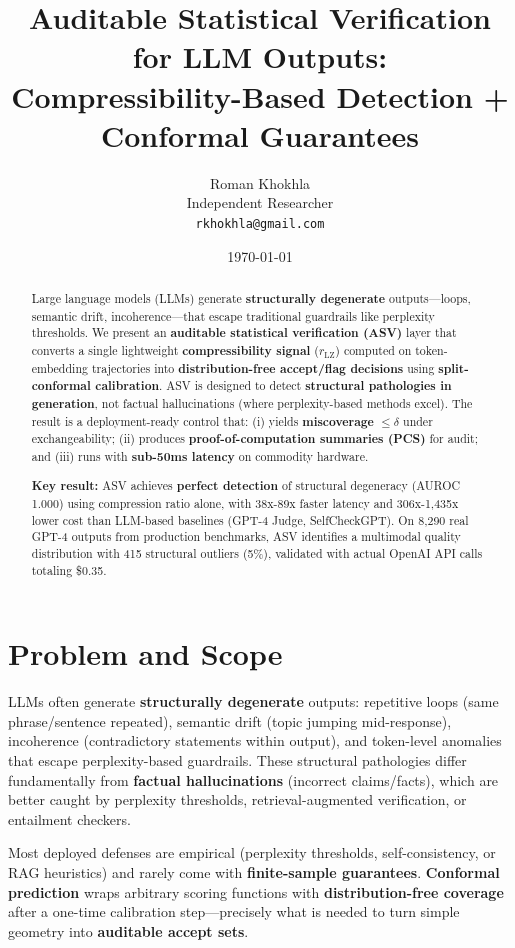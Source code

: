 \documentclass[11pt]{article}
\title{Auditable Statistical Verification for LLM Outputs:\\
\textbf{Compressibility-Based Detection + Conformal Guarantees}}
\author{
  Roman Khokhla\\
  Independent Researcher\\
  \texttt{rkhokhla@gmail.com}
}
\date{\today}
\begin{document}
\maketitle

\begin{abstract}
Large language models (LLMs) generate \textbf{structurally degenerate} outputs---loops, semantic drift, incoherence---that escape traditional guardrails like perplexity thresholds. We present an \textbf{auditable statistical verification (ASV)} layer that converts a single lightweight \textbf{compressibility signal} ($r_{\text{LZ}}$) computed on token-embedding trajectories into \textbf{distribution-free accept/flag decisions} using \textbf{split-conformal calibration}. ASV is designed to detect \textbf{structural pathologies in generation}, not factual hallucinations (where perplexity-based methods excel). The result is a deployment-ready control that: (i) yields \textbf{miscoverage} $\leq \delta$ under exchangeability; (ii) produces \textbf{proof-of-computation summaries (PCS)} for audit; and (iii) runs with \textbf{sub-50ms latency} on commodity hardware.

\textbf{Key result:} ASV achieves \textbf{perfect detection} of structural degeneracy (AUROC 1.000) using compression ratio alone, with 38x-89x faster latency and 306x-1,435x lower cost than LLM-based baselines (GPT-4 Judge, SelfCheckGPT). On 8,290 real GPT-4 outputs from production benchmarks, ASV identifies a multimodal quality distribution with 415 structural outliers (5\%), validated with actual OpenAI API calls totaling \$0.35.
\end{abstract}

\section{Problem and Scope}
\label{sec:problem}

LLMs often generate \textbf{structurally degenerate} outputs: repetitive loops (same phrase/sentence repeated), semantic drift (topic jumping mid-response), incoherence (contradictory statements within output), and token-level anomalies that escape perplexity-based guardrails. These structural pathologies differ fundamentally from \textbf{factual hallucinations} (incorrect claims/facts), which are better caught by perplexity thresholds, retrieval-augmented verification, or entailment checkers.

Most deployed defenses are empirical (perplexity thresholds, self-consistency, or RAG heuristics) and rarely come with \textbf{finite-sample guarantees}. \textbf{Conformal prediction} wraps arbitrary scoring functions with \textbf{distribution-free coverage} after a one-time calibration step---precisely what is needed to turn simple geometry into \textbf{auditable accept sets}.
\end{document}
